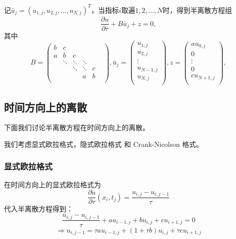 \documentclass{article}
\begin{document}
记$\bar{u}_j = (u_{1, j}, u_{2, j},...,u_{N, j})^T$，当指标$i$取遍$1,2,...,N$时，得到半离散方程组
$$\frac{\partial u}{\partial \tau} + B\bar{u}_j + z = 0, $$
其中$$
B = \begin{pmatrix}
        b &   c    &        &        &   & \\
        a &   b    &   c    &        &   & \\
          & \ddots & \ddots & \ddots &   & \\
          &        & \ddots & \ddots & c & \\
          &        &        &   a    & b & \\
    \end{pmatrix},
\bar{u}_j = \begin{pmatrix}
        u_{1, j}   \\
        u_{2, j}   \\
        \vdots     \\
        u_{N-1, j} \\
        u_{N, j}   \\
    \end{pmatrix},
z = \begin{pmatrix}
        au_{0, j}   \\
        0           \\
        \vdots      \\
        0           \\
        cu_{N+1, j} \\
    \end{pmatrix},
$$





\subsection{时间方向上的离散}

下面我们讨论半离散方程在时间方向上的离散。

我们考虑显式欧拉格式，隐式欧拉格式 和 Crank-Nicolson 格式。





\subsubsection{显式欧拉格式}

在时间方向上的显式欧拉格式为$$\frac{\partial u}{\partial \tau}(x_i, t_j) = \frac{u_{i, j} - u_{i, j-1}}{\tau}$$
代入半离散方程得到：$$\frac{u_{i, j} - u_{i, j-1}}{\tau} + au_{i-1, j} + bu_{i, j} + cu_{i+1, j} = 0$$
$$\Rightarrow u_{i, j-1} = \tau au_{i-1, j} + (1 + \tau b)u_{i, j} + \tau cu_{i+1, j}$$
\end{document}
